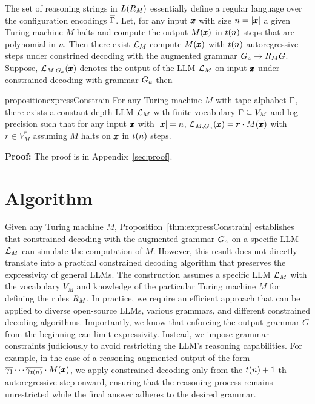 The set of reasoning strings in $L(R_{M})$ essentially define a regular language over the configuration encodings $\overline{\Gamma}$. Let, for any input $\pmb{x}$ with size $n = |\pmb{x}|$ a given Turing machine $M$ halts and compute the output $M(\pmb{x})$ in $t(n)$ steps that are polynomial in $n$. Then there exist $\mathcal{L}{}_{M}$ compute $M(\pmb{x})$ with $t(n)$ autoregressive steps under constrined decoding with the augmented grammar $G_a \to R_{M} G$. Suppose, $\mathcal{L}_{M,{G_a}}(\pmb{x})$ denotes the output of the LLM $\mathcal{L}_{M}$ on input $\pmb{x}$ under constrained decoding with grammar $G_a$ then
\begin{restatable}{proposition}{expressConstrain}
\label{thm:expressConstrain}
For any Turing machine $M$ with tape alphabet $\Gamma$, there exists a constant depth LLM $\mathcal{L}{}_{M}$ with finite vocabulary $\Gamma \subseteq V_{M}$ and log precision such that for any input $\pmb{x}$ with $|\pmb{x}| = n$, $\mathcal{L}_{M,{G_a}}(\pmb{x}) = \pmb{r} \cdot M(\pmb{x})$ with $r \in V_{M}^{*}$ assuming $M$ halts on $\pmb{x}$ in $t(n)$ steps.
\end{restatable}
\textbf{Proof:} The proof is in Appendix~\ref{sec:proof}.
\section{\Tool Algorithm}
Given any Turing machine $M$, Proposition~\ref{thm:expressConstrain} establishes that constrained decoding with the augmented grammar $G_a$ on a specific LLM $ \mathcal{L}_{M} $ can simulate the computation of $ M $. However, this result does not directly translate into a practical constrained decoding algorithm that preserves the expressivity of general LLMs. The construction assumes a specific LLM $ \mathcal{L}_{M} $ with the vocabulary $V_{M}$ and knowledge of the particular Turing machine $M$ for defining the rules $R_{M}$. In practice, we require an efficient approach that can be applied to diverse open-source LLMs, various grammars, and different constrained decoding algorithms. Importantly, we know that enforcing the output grammar $ G $ from the beginning can limit expressivity. Instead, we impose grammar constraints judiciously to avoid restricting the LLM's reasoning capabilities. For example, in the case of a reasoning-augmented output of the form $ \overline{\gamma_{1}}\cdots \overline{\gamma_{t(n)}} \cdot M(\pmb{x}) $, we apply constrained decoding only from the $ t(n) + 1 $-th autoregressive step onward, ensuring that the reasoning process remains unrestricted while the final answer adheres to the desired grammar. 

